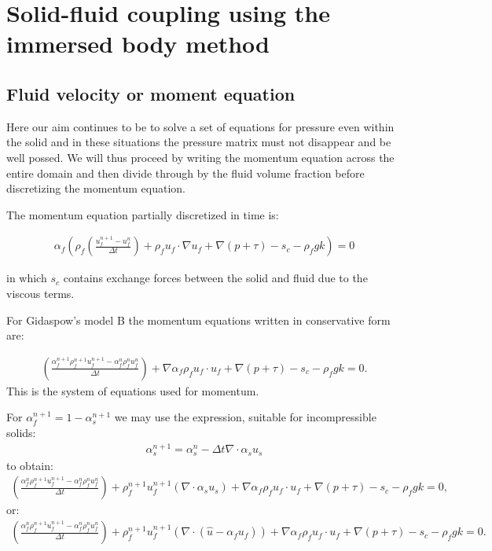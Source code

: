 \vfill\eject



\section{Solid-fluid coupling using the immersed body method} 



\subsection{Fluid velocity or moment equation} 
Here our aim continues to be to solve a set of equations 
for pressure even within the solid and in these situations 
the pressure matrix must not disappear and be well possed. 
We will thus proceed by writing the momentum equation 
across the entire domain and then divide through by the 
fluid volume fraction before discretizing the momentum equation. 

The momentum equation partially discretized in time is:

\begin{eqnarray}
\alpha_f ( \rho_f (\frac{u_f^{n+1}-u_f^n}{\Delta t})
+ \rho_f u_f\cdot \nabla u_f 
+\nabla (p+\tau)  -s_c -\rho_f g k)=0
\label{mom-for-div-by-apha}
\end{eqnarray}

in which $s_c$ contains exchange forces between the 
solid and fluid due to the viscous terms. 

For Gidaspow's model B the momentum equations written in conservative form are: 

\begin{eqnarray}
(\frac{\alpha_f^{n+1} \rho_f^{n+1} u_f^{n+1}-\alpha_f^{n} \rho_f^{n} u_f^n}{\Delta t})
+ \nabla \alpha_f \rho_f u_f\cdot u_f 
+\nabla (p+\tau)  -s_c -\rho_f g k=0. 
\label{mom-for-div-by-apha-modelB}
\end{eqnarray}
This is the system of equations used for momentum. 

For $\alpha_f^{n+1}=1-\alpha_s^{n+1}$ we may use the expression, suitable for incompressible solids: 
\begin{eqnarray}
\alpha_s^{n+1}= \alpha_s^{n} - \Delta t \nabla \cdot \alpha_s u_s
\end{eqnarray}
to obtain: 
\begin{eqnarray}
(\frac{\alpha_f^{n} \rho_f^{n+1} u_f^{n+1}-\alpha_f^{n} \rho_f^{n} u_f^n}{\Delta t})
+\rho_f^{n+1} u_f^{n+1} (\nabla \cdot \alpha_s u_s) 
+ \nabla \alpha_f \rho_f u_f\cdot u_f 
+\nabla (p+\tau)  -s_c -\rho_f g k=0, 
\label{mom-for-div-by-apha-modelB-with-grad}
\end{eqnarray}
or: 
\begin{eqnarray}
(\frac{\alpha_f^{n} \rho_f^{n+1} u_f^{n+1}-\alpha_f^{n} \rho_f^{n} u_f^n}{\Delta t})
+\rho_f^{n+1} u_f^{n+1} (\nabla \cdot (\hat u - \alpha_f u_f)) 
+ \nabla \alpha_f \rho_f u_f\cdot u_f 
+\nabla (p+\tau)  -s_c -\rho_f g k=0. 
\label{mom-for-div-by-apha-modelB-with-grad-or}
\end{eqnarray}

